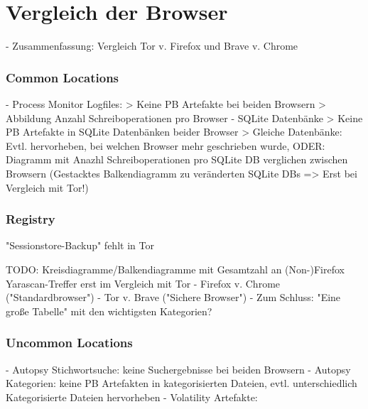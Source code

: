 \chapter{Vergleich der Browser}
\label{chapter:vergleich-der-browser}

- Zusammenfassung: Vergleich Tor v. Firefox und Brave v. Chrome

\subsection*{Common Locations}
- Process Monitor Logfiles: 
	> Keine PB Artefakte bei beiden Browsern
	> Abbildung Anzahl Schreiboperationen pro Browser
- SQLite Datenbänke
	> Keine PB Artefakte in SQLite Datenbänken beider Browser
	> Gleiche Datenbänke: Evtl. hervorheben, bei welchen Browser mehr geschrieben wurde, ODER: Diagramm mit Anazhl Schreiboperationen pro SQLite DB verglichen zwischen Browsern
		(Gestacktes Balkendiagramm zu veränderten SQLite DBs => Erst bei Vergleich mit Tor!)

\subsection*{Registry}
 "Sessionstore-Backup" fehlt in Tor

TODO: Kreisdiagramme/Balkendiagramme mit Gesamtzahl an (Non-)Firefox Yarascan-Treffer erst im Vergleich mit Tor
- Firefox v. Chrome ("Standardbrowser")
- Tor v. Brave ("Sichere Browser")
- Zum Schluss: "Eine große Tabelle" mit den wichtigsten Kategorien?

\subsection*{Uncommon Locations}
- Autopsy Stichwortsuche: keine Suchergebnisse bei beiden Browsern
- Autopsy Kategorien: keine PB Artefakten in kategorisierten Dateien, evtl. unterschiedlich Kategorisierte Dateien hervorheben
- Volatility Artefakte:

